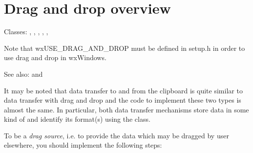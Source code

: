 \section{Drag and drop overview}\label{wxdndoverview}

Classes: , 
, 
, 
, 
, 

Note that wxUSE\_DRAG\_AND\_DROP must be defined in setup.h in order
to use drag and drop in wxWindows.

See also:  and 

It may be noted that data transfer to and from the clipboard is quite
similar to data transfer with drag and drop and the code to implement
these two types is almost the same. In particular, both data transfer
mechanisms store data in some kind of 
and identify its format(s) using the 
class.

To be a {\it drag source}, i.e. to provide the data which may be dragged by
user elsewhere, you should implement the following steps:

